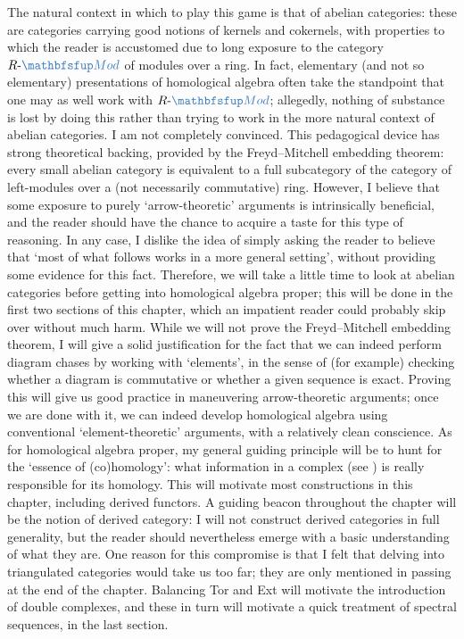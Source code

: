 The natural context in which to play this game is that of abelian
categories: these are categories carrying good notions of kernels and
cokernels, with properties to which the reader is accustomed due to
long exposure to the category $R\text{-}\categ{Mod}$ of modules over a
ring. In fact, elementary (and not so elementary) presentations of
homological algebra often take the standpoint that one may as well
work with $R\text{-}\categ{Mod}$; allegedly, nothing of substance is
lost by doing this rather than trying to work in the more natural
context of abelian categories.  I am not completely convinced. This
pedagogical device has strong theoretical backing, provided by the
Freyd--Mitchell embedding theorem: every small abelian category is
equivalent to a full subcategory of the category of left-modules over
a (not necessarily commutative) ring.  However, I believe that some
exposure to purely `arrow-theoretic' arguments is intrinsically
beneficial, and the reader should have the chance to acquire a taste
for this type of reasoning. In any case, I dislike the idea of simply
asking the reader to believe that `most of what follows works in a
more general setting', without providing some evidence for this fact.
Therefore, we will take a little time to look at abelian categories
before getting into homological algebra proper; this will be done in
the first two sections of this chapter, which an impatient reader
could probably skip over without much harm. While we will not prove
the Freyd--Mitchell embedding theorem, I will give a solid
justification for the fact that we can indeed perform diagram chases
by working with `elements', in the sense of (for example) checking
whether a diagram is commutative or whether a given sequence is exact.
Proving this will give us good practice in maneuvering arrow-theoretic
arguments; once we are done with it, we can indeed develop homological
algebra using conventional `element-theoretic' arguments, with a
relatively clean conscience.  As for homological algebra proper, my
general guiding principle will be to hunt for the `essence of
(co)homology': what information in a complex (see
) is really responsible for
its homology. This will motivate most constructions in this chapter,
including derived functors. A guiding beacon throughout the chapter
will be the notion of derived category: I will not construct derived
categories in full generality, but the reader should nevertheless
emerge with a basic understanding of what they are. One reason for
this compromise is that I felt that delving into triangulated
categories would take us too far; they are only mentioned in passing
at the end of the chapter.  Balancing Tor and Ext will motivate the
introduction of double complexes, and these in turn will motivate a
quick treatment of spectral sequences, in the last section.

